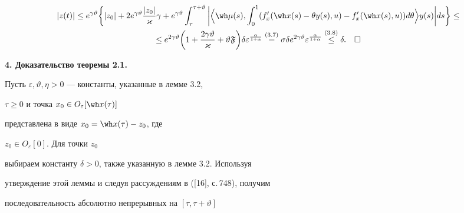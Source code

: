 \begin{gather*}


|z(t)|\le e^{\gamma\vartheta}


\bigg\{|z_0|+2e^{\gamma\vartheta}\frac{|z_0|}{{\varkappa}}\gamma +


e^{\gamma\vartheta}\int_\tau^{\tau+\vartheta}


\bigg|\Big\langle\wh\mu(s),\int_0^1


(f'_x(\wh x(s)-\theta y(s),u)-


f'_x(\wh x(s),u))d\theta\Big\rangle y(s)\bigg|ds\bigg\}\le \\


\le e^{2\gamma\vartheta}\bigg(1+\frac{2\gamma\vartheta}{\varkappa}+


\vartheta \frak F\bigg)\delta


\varepsilon^{\frac{\alpha}{1+\alpha}}


\up{(3.7)}{=}\sigma\delta e^{2\gamma\vartheta}\varepsilon^{\frac{\alpha}


{1+\alpha}}\up{(3.8)}{\le}\delta.\quad\square


\end{gather*}





\addtocounter{section}{1}


\setcounter{equation}{0}


\setcounter{thms}{0}


\setcounter{lems}{0}


\setcounter{cors}{0}


\setcounter{notes}{0}


\setcounter{defns}{0}








{\bf 4. Доказательство теоремы 2.1.}


Пусть $\varepsilon,\vartheta,\eta>0$ --- константы, указанные в лемме 3.2,


$\tau\ge0$ и точка $x_0\in O_\varepsilon[\wh x(\tau)]$


представлена в виде $x_0=\wh x(\tau)-z_0$, где


$z_0\in O_\varepsilon[0]$. Для точки $z_0$


выбираем константу $\delta>0$, также указанную в лемме 3.2. Используя


утверждение этой леммы и следуя рассуждениям в ([16], с.\,748), получим


последовательность абсолютно непрерывных на $[\tau,\tau+\vartheta]$


